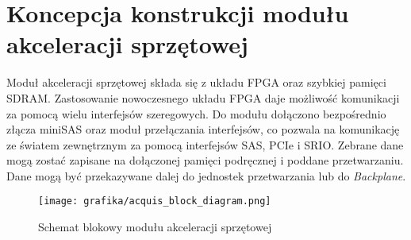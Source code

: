 %
%
% 
%

\section{Koncepcja konstrukcji modułu akceleracji sprzętowej}
Moduł akceleracji sprzętowej składa się z układu FPGA oraz szybkiej pamięci SDRAM. Zastosowanie nowoczesnego układu FPGA daje możliwość komunikacji za pomocą wielu interfejsów szeregowych. Do modułu dołączono bezpośrednio złącza miniSAS oraz moduł przełączania interfejsów, co pozwala na komunikację ze światem zewnętrznym za pomocą interfejsów SAS, PCIe i SRIO. Zebrane dane mogą zostać zapisane na dołączonej pamięci podręcznej i poddane przetwarzaniu. Dane mogą być przekazywane dalej do jednostek przetwarzania lub do \textit{Backplane}. 
\begin{figure}[!h]
\centering
\texttt{[image: grafika/acquis\_block\_diagram.png]}
\caption{Schemat blokowy modułu akceleracji sprzętowej}
\label{BLOCK_ACKQUIS}
\end{figure}
